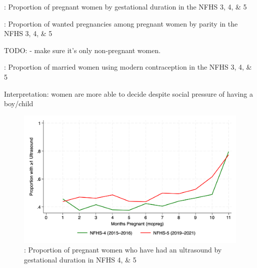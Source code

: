 \documentclass{article}
\begin{document}
\begin{table}[H]
    \centering
    \caption{: Proportion of pregnant women by gestational duration in the NFHS 3, 4, \& 5}
    \label{tab:sumstat}
\end{table}



\begin{table}[H]
    \centering
    \caption{: Proportion of wanted pregnancies among pregnant women by parity in the NFHS 3, 4, \& 5}
    \label{tab:sumstat}
\end{table}


TODO: 
- make sure it's only non-pregnant women.
\begin{table}[H]
    \centering
    \caption{: Proportion of married women using modern contraception in the NFHS 3, 4, \& 5}
    \label{tab:sumstat}
\end{table}
Interpretation: women are more able to decide despite social pressure of having a boy/child

\begin{figure}[H]
    \centering
    \includegraphics[width=\textwidth]{figures/ultrasound by pregnancy duration.png}
    \caption{: Proportion of pregnant women who have had an ultrasound by gestational duration in NFHS 4, \& 5}
\end{figure}
\end{document}

